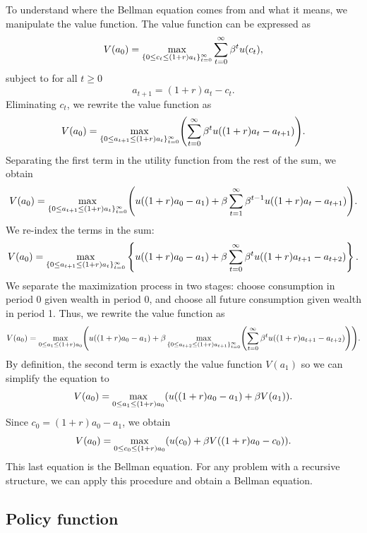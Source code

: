 \documentclass[letterpaper, 11pt, leqno]{article}
\begin{document}
To understand where the Bellman equation comes from and what it means, we manipulate the value function. The value function can be expressed as
\begin{equation*}
V(a_0) = \max[\{0\le c_t\le (1+r) a_t\}_{t=0}^{\infty}] \sum_{t=0}^{\infty}\b^t u(c_t),
\end{equation*}
subject to for all $t\ge 0$
\begin{equation*}
a_{t+1} = (1+r) a_t-c_t.
\end{equation*}
Eliminating $c_t$, we rewrite the value function as
\begin{equation*}
V(a_0)=\max[\{0\le a_{t+1}\le (1+r) a_t\}_{t=0}^{\infty}]{\sum_{t=0}^{\infty}\b^t u((1+r) a_t-a_{t+1})}.
\end{equation*}
Separating the first term in the utility function from the rest of the sum, we obtain
\begin{equation*}
V(a_0)=\max[\{0\le a_{t+1}\le (1+r) a_t\}_{t=0}^{\infty}]{u((1+r) a_0-a_1)+\b \sum_{t=1}^{\infty}\b^{t-1} u((1+r) a_t-a_{t+1})}.
\end{equation*}
We re-index the terms in the sum:
\begin{equation*}
V(a_0) = \max[\{0\le a_{t+1}\le (1+r) a_t\}_{t=0}^{\infty}] \bc{u((1+r) a_0-a_1)+\b \sum_{t=0}^{\infty}\b^{t} u((1+r) a_{t+1}-a_{t+2})}.
\end{equation*}
We separate the maximization process in two stages: choose consumption in period 0 given wealth in period 0, and choose all future consumption given wealth in period 1. Thus, we rewrite the value function as
\begin{equation*}
V(a_0) = \max[0\le a_{1}\le (1+r) a_0]{u((1+r) a_0-a_1)+\b\max[\{0\le a_{t+2}\le (1+r) a_{t+1}\}_{t=0}^{\infty}]{\sum_{t=0}^{\infty}\b^{t} u((1+r) a_{t+1}-a_{t+2})}}.
\end{equation*}
By definition, the second term is exactly the value function $V(a_{1})$ so we can simplify the equation to
\begin{equation*}
V(a_0) = \max[0\le a_{1}\le (1+r) a_0]{u((1+r) a_0-a_1)+\b V(a_1)}.
\end{equation*}
Since $c_{0}=(1+r) a_0-a_1$, we obtain
\begin{equation*}
V(a_0) = \max[0\le c_{0}\le (1+r) a_0]{u(c_0)+\b V((1+r) a_0-c_0)}.
\end{equation*}
This last equation is the Bellman equation. For any problem with a recursive structure, we can apply this procedure and obtain a Bellman equation.

\subsection{Policy function}
\end{document}

